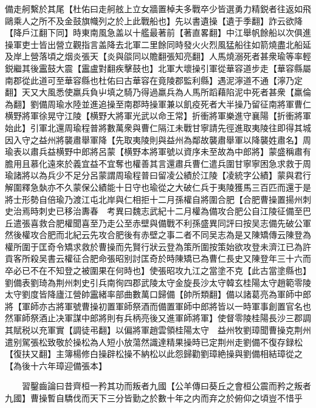 備走舸繫於其尾【杜佑曰走舸舷上立女牆置棹夫多戰卒少皆選勇力精鋭者往返如飛鷗乘人之所不及金鼓旗幟列之於上此戰船也】先以書遺操【遺于季翻】詐云欲降【降戶江翻下同】時東南風急盖以十艦最著前【著直畧翻】中江舉帆餘船以次俱進操軍吏士皆出營立觀指言盖降去北軍二里餘同時發火火烈風猛船往如箭燒盡北船延及岸上營落頃之烟炎張天【炎與燄同以贍翻張知亮翻】人馬燒溺死者甚衆瑜等率輕鋭繼其後靁鼓大震【靁盧對翻疾擊鼓也】北軍大壞操引軍從華容道步走【華容縣屬南郡從此道可至華容縣也杜佑曰古華容在竟陵郡監利縣】遇泥濘道不通【濘乃定翻】天又大風悉使羸兵負屮填之騎乃得過羸兵為人馬所蹈藉陷泥中死者甚衆【羸倫為翻】劉備周瑜水陸並進追操至南郡時操軍兼以飢疫死者大半操乃留征南將軍曹仁横野將軍徐晃守江陵【横野大將軍光武以命王常】折衝將軍樂進守襄陽【折衝將軍始此】引軍北還周瑜程普將數萬衆與曹仁隔江未戰甘寧請先徑進取夷陵往即得其城因入守之益州將襲肅舉軍降【先取夷陵則與益州為鄰故襲肅舉軍以降襲姓肅名】周瑜表以肅兵益横野中郎將呂蒙【横野本將軍號以資序未至故為中郎將】蒙盛稱肅有膽用且慕化遠來於義宜益不宜奪也權善其言還肅兵曹仁遣兵圍甘寧寧困急求救于周瑜諸將以為兵少不足分呂蒙謂周瑜程普曰留凌公績於江陵【凌統字公績】蒙與君行解圍釋急埶亦不久蒙保公績能十日守也瑜從之大破仁兵于夷陵獲馬三百匹而還于是將士形勢自倍瑜乃渡江屯北岸與仁相拒十二月孫權自將圍合肥【合肥曹操置揚州刺史治焉時刺史已移治夀春　考異曰魏志武紀十二月權為備攻合肥公自江陵征備至巴丘遣張喜救合肥權聞喜至乃走公至赤壁與備戰不利孫盛異同評曰按吴志備先破公軍然後權攻合肥而北紀云先攻合肥後有赤壁之事二者不同吴志為是又陳矯傳云陳登為權所圍于匡奇令矯求救於曹操而先賢行狀云登為策所圍按策始欲攻登未濟江已為許貢客所殺吴書云權征合肥命張昭别討匡奇於時陳矯已為曹仁長史又陳登年三十六而卒必已不在不知登之被圍果在何時也】使張昭攻九江之當塗不克【此古當塗縣也】劉備表劉琦為荆州刺史引兵南徇四郡武陵太守金旋長沙太守韓玄桂陽太守趙範零陵太守劉度皆降廬江營帥靁緒率部曲數萬口歸備【帥所類翻】備以諸葛亮為軍師中郎將【軍師亦古將軍號曹操初置軍師祭酒而備置軍師中郎將皆以一時軍事創置官名也然軍師祭酒止决軍謀中郎將則有兵柄亮後又進軍師將軍】使督零陵桂陽長沙三郡調其賦税以充軍實【調徒弔翻】以偏將軍趙雲領桂陽太守　益州牧劉璋聞曹操克荆州遣别駕張松致敬於操松為人短小放蕩然識達精果操時已定荆州走劉備不復存録松【復扶又翻】主簿楊修白操辟松操不納松以此怨歸勸劉璋絶操與劉備相結璋從之【為後十六年璋迎備張本】

　　習鑿齒論曰昔齊桓一矜其功而叛者九國【公羊傳曰葵丘之會桓公震而矜之叛者九國】曹操暫自驕伐而天下三分皆勤之於數十年之内而弃之於俯仰之頃豈不惜乎

